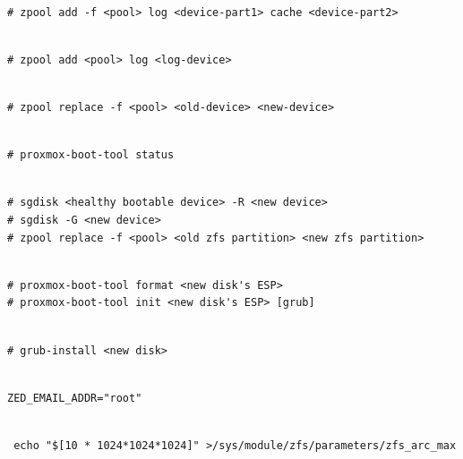 \begin{lstlisting}

# zpool add -f <pool> log <device-part1> cache <device-part2>

\end{lstlisting}

\begin{lstlisting}

# zpool add <pool> log <log-device>

\end{lstlisting}

\begin{lstlisting}

# zpool replace -f <pool> <old-device> <new-device>

\end{lstlisting}

\begin{lstlisting}

# proxmox-boot-tool status

\end{lstlisting}

\begin{lstlisting}

# sgdisk <healthy bootable device> -R <new device>
# sgdisk -G <new device>
# zpool replace -f <pool> <old zfs partition> <new zfs partition>

\end{lstlisting}

\begin{lstlisting}

# proxmox-boot-tool format <new disk's ESP>
# proxmox-boot-tool init <new disk's ESP> [grub]

\end{lstlisting}

\begin{lstlisting}

# grub-install <new disk>

\end{lstlisting}

\begin{lstlisting}

ZED_EMAIL_ADDR="root"

\end{lstlisting}

\begin{lstlisting}

 echo "$[10 * 1024*1024*1024]" >/sys/module/zfs/parameters/zfs_arc_max

\end{lstlisting}


